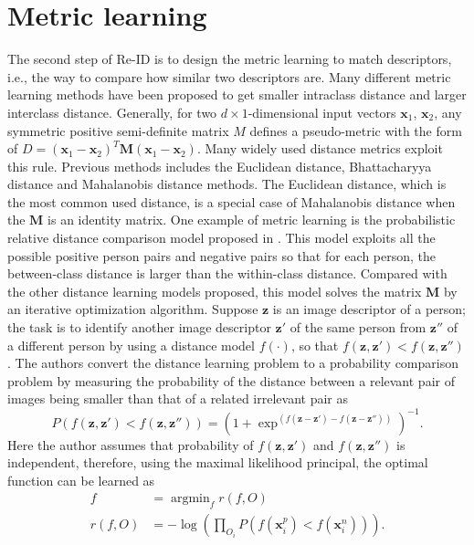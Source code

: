 \section{Metric learning}
The second step of Re-ID is to design the metric learning to match descriptors, i.e., the way to compare how similar two descriptors are. Many different metric learning methods have been proposed \cite{KISSME, LFDA, PCCA, TDL, PRDC, LMNN, KLFDA, KCCA, KernelVersionMetrics, NFST, ITML} to get smaller intraclass distance and larger interclass distance. Generally, for two $d\times 1$-dimensional input vectors $\bm{x}_1$, $\bm{x}_2$, any symmetric positive semi-definite matrix $M$ defines a pseudo-metric with the form of $D = (\bm{x}_1 -\bm{x}_2)^T\bm{M}(\bm{x}_1 - \bm{x}_2)$. Many widely used distance metrics exploit this rule. Previous methods includes the Euclidean distance, Bhattacharyya distance and Mahalanobis distance methods. The Euclidean distance, which is the most common used distance, is a special case of Mahalanobis distance when the $\bm{M}$ is an identity matrix. One example of metric learning is the probabilistic relative distance comparison model proposed in \cite{PRDC}. This model exploits all the possible positive person pairs and negative pairs so that for each person, the between-class distance is larger than the within-class distance. Compared with the other distance learning models proposed, this model solves the matrix $\bm{M}$ by an iterative optimization algorithm. Suppose $\bm{z}$ is an image descriptor of a person; the task is to identify another image descriptor $\bm{z}'$ of the same person from $\bm{z}''$ of a different person by using a distance model $f(\cdot)$, so that $f(\bm{z}, \bm{z}')< f(\bm{z}, \bm{z}'')$. The authors convert the distance learning problem to a probability comparison problem by measuring the probability of the distance between a relevant pair of images being smaller than that of a related irrelevant pair as
\begin{equation}
P(f(\bm{z},\bm{z}')<f(\bm{z},\bm{z}'')) = (1+\exp^{(f(\bm{z}-\bm{z}')-f(\bm{z}-\bm{z}''))})^{-1}.
\end{equation}
Here the author assumes that probability of $f(\bm{z},\bm{z}')$ and $f(\bm{z},\bm{z}'')$ is independent, therefore, using the maximal likelihood principal, the optimal function can be learned as
\begin{equation}
\begin{aligned}
f &= \mathop{\arg\min}_f r(f,O) \\
r(f,O) &= -\log(\prod_{O_i}P(f(\bm{x}_i^p) < f(\bm{x}_i^n))).
\end{aligned}
\end{equation}
